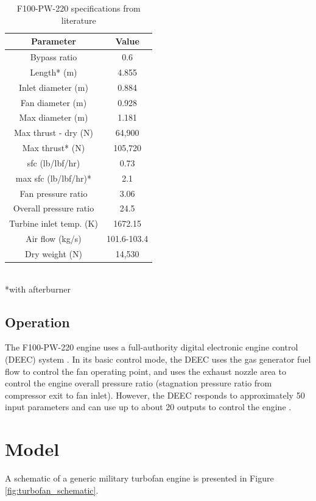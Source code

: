 \documentclass{article}
\begin{document}
\begin{table}
\caption{F100-PW-220 specifications from literature}
\label{tab:engine_specifications}
\begin{center}
\begin{tabular}[]{c | c }
Parameter & Value \\
\hline
Bypass ratio & 0.6 \\
Length* (m) & 4.855 \\
Inlet diameter (m) & 0.884 \\
Fan diameter (m) & 0.928 \\
Max diameter (m) & 1.181 \\
Max thrust - dry (N) & 64,900 \\
Max thrust* (N) & 105,720 \\
sfc (lb/lbf/hr) & 0.73 \\
max sfc (lb/lbf/hr)* & 2.1 \\
Fan pressure ratio & 3.06 \\
Overall pressure ratio & 24.5 \\
Turbine inlet temp. (K) & 1672.15 \\
Air flow (kg/s) & 101.6-103.4 \\
Dry weight (N) & 14,530 \\
\end{tabular} \\
\footnotesize{*with afterburner}
\end{center}
\end{table}

\subsection{Operation}

The F100-PW-220 engine uses a full-authority digital electronic engine control (DEEC) system \cite{Childre1989}. In its basic control mode, the DEEC uses the gas generator fuel flow to control the fan operating point, and uses the exhaust nozzle area to control the engine overall pressure ratio (stagnation pressure ratio from compressor exit to fan inlet). However, the DEEC responds to approximately 50 input parameters and can use up to about 20 outputs to control the engine \cite{Childre1989}.


\section{Model}

A schematic of a generic military turbofan engine is presented in Figure \ref{fig:turbofan_schematic}. 
\end{document}

